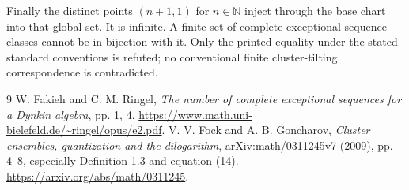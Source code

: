 \documentclass[10pt,a4paper]{article}
\begin{document}
Finally the distinct points $(n+1,1)$ for $n\in\mathbb N$ inject through
the base chart into that global set. It is infinite. A finite set of
complete exceptional-sequence classes cannot be in bijection with it.
Only the printed equality under the stated standard conventions is refuted;
no conventional finite cluster-tilting correspondence is contradicted.

\begin{thebibliography}{9}
 W. Fakieh and C. M. Ringel,
\emph{The number of complete exceptional sequences for a Dynkin algebra},
pp. 1, 4. \url{https://www.math.uni-bielefeld.de/~ringel/opus/e2.pdf}.
 V. V. Fock and A. B. Goncharov,
\emph{Cluster ensembles, quantization and the dilogarithm},
arXiv:math/0311245v7 (2009), pp. 4--8, especially Definition 1.3
and equation (14). \url{https://arxiv.org/abs/math/0311245}.
\end{thebibliography}
\end{document}
